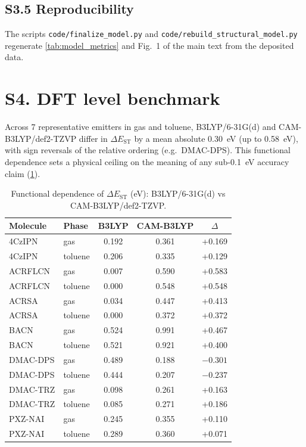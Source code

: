 \documentclass[twoside,twocolumn,9pt]{extarticle}
\begin{document}
\subsection*{S3.5 Reproducibility}
The scripts \texttt{code/finalize\_model.py} and
\texttt{code/rebuild\_structural\_model.py} regenerate \cref{tab:model_metrics}
and Fig.~1 of the main text from the deposited data.

\section*{S4. DFT level benchmark}
Across \num{7} representative emitters in gas and toluene, B3LYP/6-31G(d) and
CAM-B3LYP/def2-TZVP differ in $\Delta E_\text{ST}$ by a mean absolute
\qty{0.30}{\electronvolt} (up to \qty{0.58}{\electronvolt}), with sign reversals
of the relative ordering (e.g.\ DMAC-DPS). This functional dependence sets a
physical ceiling on the meaning of any sub-\qty{0.1}{\electronvolt} accuracy
claim (\cref{tab:dft_benchmark}).

\begin{table}[htbp]
  \centering
  \caption{Functional dependence of $\Delta E_\text{ST}$ (eV): B3LYP/6-31G(d)
    vs CAM-B3LYP/def2-TZVP.}
  \label{tab:dft_benchmark}
  \small
  \begin{tabular}{llccc}
    \toprule
    Molecule & Phase & B3LYP & CAM-B3LYP & $\Delta$ \\
    \midrule
    4CzIPN & gas & 0.192 & 0.361 & +0.169 \\
    4CzIPN & toluene & 0.206 & 0.335 & +0.129 \\
    ACRFLCN & gas & 0.007 & 0.590 & +0.583 \\
    ACRFLCN & toluene & 0.000 & 0.548 & +0.548 \\
    ACRSA & gas & 0.034 & 0.447 & +0.413 \\
    ACRSA & toluene & 0.000 & 0.372 & +0.372 \\
    BACN & gas & 0.524 & 0.991 & +0.467 \\
    BACN & toluene & 0.521 & 0.921 & +0.400 \\
    DMAC-DPS & gas & 0.489 & 0.188 & $-0.301$ \\
    DMAC-DPS & toluene & 0.444 & 0.207 & $-0.237$ \\
    DMAC-TRZ & gas & 0.098 & 0.261 & +0.163 \\
    DMAC-TRZ & toluene & 0.085 & 0.271 & +0.186 \\
    PXZ-NAI & gas & 0.245 & 0.355 & +0.110 \\
    PXZ-NAI & toluene & 0.289 & 0.360 & +0.071 \\
    \bottomrule
  \end{tabular}
\end{table}
\end{document}
